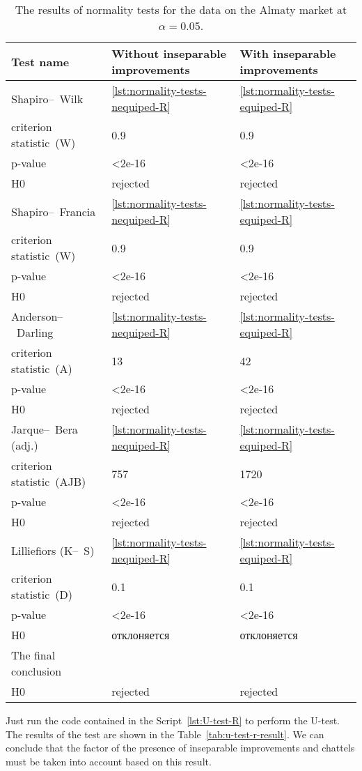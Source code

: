\documentclass[]{scrreprt}
\begin{document}
\begin{table}[htp]
	\caption{The results of normality tests for the data on the Almaty market at $\alpha=0.05$.}\label{tab:normality-tests-values-R}
	\centering
	\begin{tabular}{lll}
		\hline
		Test name&Without inseparable improvements&With inseparable improvements\\
		\hline
		Shapiro--~Wilk&\ref{lst:normality-tests-nequiped-R}&\ref{lst:normality-tests-equiped-R}\\
		criterion statistic~(W)&0.9&0.9\\
		p-value&<2e-16&<2e-16\\
		H0&rejected&rejected\\
		\hline
		Shapiro--~Francia&\ref{lst:normality-tests-nequiped-R}&\ref{lst:normality-tests-equiped-R}\\
		criterion statistic~(W)&0.9&0.9\\
		p-value&<2e-16&<2e-16\\
		H0&rejected&rejected\\
		\hline
		Anderson--~Darling&\ref{lst:normality-tests-nequiped-R}&\ref{lst:normality-tests-equiped-R}\\
		criterion statistic~(A)&13&42\\
		p-value&<2e-16&<2e-16\\
		H0&rejected&rejected\\
		\hline
		Jarque--~Bera (adj.)&\ref{lst:normality-tests-nequiped-R}&\ref{lst:normality-tests-equiped-R}\\
		criterion statistic~(AJB)&757&1720\\
		p-value&<2e-16&<2e-16\\
		H0&rejected&rejected\\
		\hline
		Lilliefiors (K--~S)&\ref{lst:normality-tests-nequiped-R}&\ref{lst:normality-tests-equiped-R}\\
		criterion statistic~(D)&0.1&0.1\\
		p-value&<2e-16&<2e-16\\
		H0&отклоняется&отклоняется\\
		\hline
		The final conclusion&&\\
		H0&rejected&rejected\\
		\hline
	\end{tabular}
\end{table}
%
Just run the code contained in the Script~\ref{lst:U-test-R} to perform the U-test. The results of the test are shown in the Table~\ref{tab:u-test-r-result}. We can conclude that the factor of the presence of inseparable improvements and chattels must be taken into account based on this result.
\end{document}
